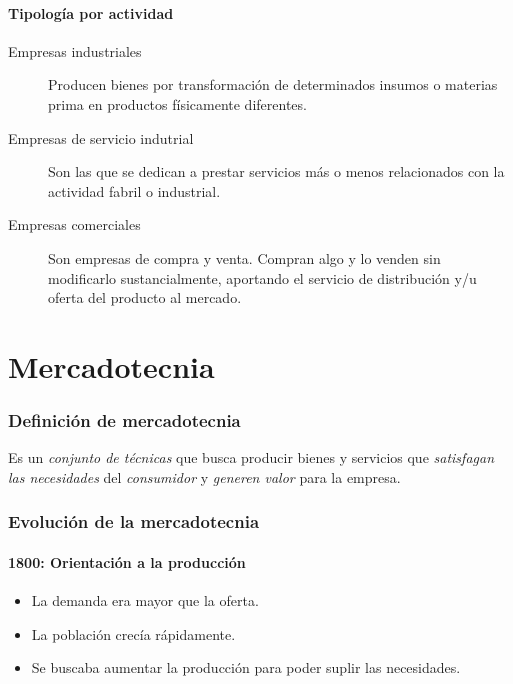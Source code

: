 \documentclass[9pt, spanish, a5paper]{article}
\begin{document}
\subsection{Tipología por actividad}
\begin{description}
	\item[Empresas industriales] Producen bienes por transformación de determinados insumos o materias prima en productos físicamente diferentes.
	
	\item[Empresas de servicio indutrial] Son las que se dedican a prestar servicios más o menos relacionados con la actividad fabril o industrial.
	
	\item[Empresas comerciales] Son empresas de compra y venta. Compran algo y lo venden sin modificarlo sustancialmente, aportando el servicio de distribución y/u oferta del producto al mercado.
\end{description}



\part{Mercadotecnia}

\section{Definición de mercadotecnia}
Es un \emph{conjunto de técnicas} que busca producir bienes y servicios que \emph{satisfagan las necesidades} del \emph{consumidor} y \emph{generen valor} para la empresa.

\section{Evolución de la mercadotecnia}

\subsection{1800: Orientación a la producción}

\begin{itemize}
	\item La demanda era mayor que la oferta.
	\item La población crecía rápidamente.
	\item Se buscaba aumentar la producción para poder suplir las necesidades.
\end{itemize}
\end{document}
